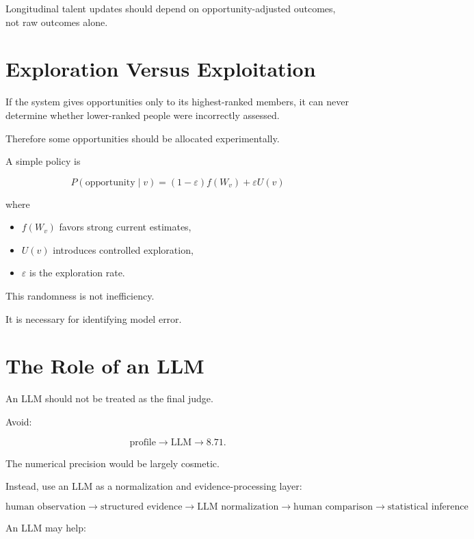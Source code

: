 \documentclass[11pt]{article}
\begin{document}
Longitudinal talent updates should depend on opportunity-adjusted outcomes,
not raw outcomes alone.

\section{Exploration Versus Exploitation}

If the system gives opportunities only to its highest-ranked members, it can
never determine whether lower-ranked people were incorrectly assessed.

Therefore some opportunities should be allocated experimentally.

A simple policy is

\[
P(\mathrm{opportunity}\mid v)
=
(1-\varepsilon)f(W_v)
+
\varepsilon U(v)
\]

where

\begin{itemize}
    \item \(f(W_v)\) favors strong current estimates,
    \item \(U(v)\) introduces controlled exploration,
    \item \(\varepsilon\) is the exploration rate.
\end{itemize}

This randomness is not inefficiency.

It is necessary for identifying model error.

\section{The Role of an LLM}

An LLM should not be treated as the final judge.

Avoid:

\[
\text{profile}
\rightarrow
\mathrm{LLM}
\rightarrow
8.71.
\]

The numerical precision would be largely cosmetic.

Instead, use an LLM as a normalization and evidence-processing layer:

\[
\boxed{
\text{human observation}
\rightarrow
\text{structured evidence}
\rightarrow
\text{LLM normalization}
\rightarrow
\text{human comparison}
\rightarrow
\text{statistical inference}
}
\]

An LLM may help:
\end{document}
